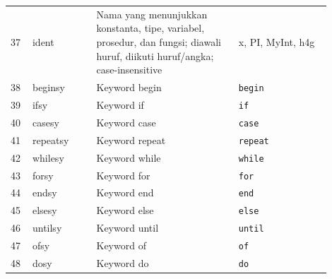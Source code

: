 \begin{center}
\begin{longtable}{p{0.06\linewidth} p{0.18\linewidth} p{0.40\linewidth} p{0.26\linewidth}}
        37 & ident       & Nama yang menunjukkan konstanta, tipe, variabel, prosedur, dan fungsi; diawali huruf, diikuti huruf/angka; case-insensitive & {\ttfamily x, PI, MyInt, h4g}  \\
        38 & beginsy     & Keyword begin                                                                                                               & \texttt{begin}                 \\
        39 & ifsy        & Keyword if                                                                                                                  & \texttt{if}                    \\
        40 & casesy      & Keyword case                                                                                                                & \texttt{case}                  \\
        41 & repeatsy    & Keyword repeat                                                                                                              & \texttt{repeat}                \\
        42 & whilesy     & Keyword while                                                                                                               & \texttt{while}                 \\
        43 & forsy       & Keyword for                                                                                                                 & \texttt{for}                   \\
        44 & endsy       & Keyword end                                                                                                                 & \texttt{end}                   \\
        45 & elsesy      & Keyword else                                                                                                                & \texttt{else}                  \\
        46 & untilsy     & Keyword until                                                                                                               & \texttt{until}                 \\
        47 & ofsy        & Keyword of                                                                                                                  & \texttt{of}                    \\
        48 & dosy        & Keyword do                                                                                                                  & \texttt{do}                    \\

\end{longtable}
\end{center}

